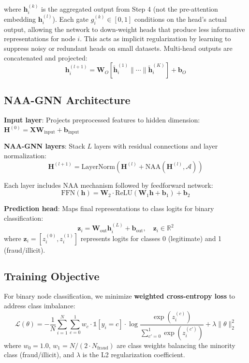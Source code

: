 where $\mathbf{h}_i^{(k)}$ is the aggregated output from Step 4 (not the pre-attention embedding $\mathbf{h}_i^{(l)}$). Each gate $g_i^{(k)} \in [0,1]$ conditions on the head's actual output, allowing the network to down-weight heads that produce less informative representations for node $i$. This acts as implicit regularization by learning to suppress noisy or redundant heads on small datasets. Multi-head outputs are concatenated and projected:
\begin{equation}
\mathbf{h}_i^{(l+1)} = \mathbf{W}_O \left[ \tilde{\mathbf{h}}_i^{(1)} \| \cdots \| \tilde{\mathbf{h}}_i^{(K)} \right] + \mathbf{b}_O
\end{equation}

\subsection{NAA-GNN Architecture}

\textbf{Input layer}: Projects preprocessed features to hidden dimension: $\mathbf{H}^{(0)} = \mathbf{X} \mathbf{W}_{\text{input}} + \mathbf{b}_{\text{input}}$

\textbf{NAA-GNN layers}: Stack $L$ layers with residual connections and layer normalization:
\begin{equation}
\mathbf{H}^{(l+1)} = \text{LayerNorm}\left( \mathbf{H}^{(l)} + \text{NAA}(\mathbf{H}^{(l)}, \mathcal{A}) \right)
\end{equation}

Each layer includes NAA mechanism followed by feedforward network:
\begin{equation}
\text{FFN}(\mathbf{h}) = \mathbf{W}_2 \cdot \text{ReLU}(\mathbf{W}_1 \mathbf{h} + \mathbf{b}_1) + \mathbf{b}_2
\end{equation}

\textbf{Prediction head}: Maps final representations to class logits for binary classification:
\begin{equation}
\mathbf{z}_i = \mathbf{W}_{\text{out}} \mathbf{h}_i^{(L)} + \mathbf{b}_{\text{out}}, \quad \mathbf{z}_i \in \mathbb{R}^{2}
\end{equation}
where $\mathbf{z}_i = [z_i^{(0)}, z_i^{(1)}]$ represents logits for classes 0 (legitimate) and 1 (fraud/illicit).

\subsection{Training Objective}

For binary node classification, we minimize \textbf{weighted cross-entropy loss} to address class imbalance:
\begin{equation}
\mathcal{L}(\theta) = -\frac{1}{N} \sum_{i=1}^{N} \sum_{c=0}^{1} w_c \cdot \mathbb{1}[y_i = c] \cdot \log \frac{\exp(z_i^{(c)})}{\sum_{c'=0}^{1} \exp(z_i^{(c')})} + \lambda \|\theta\|_2^2
\end{equation}
where $w_0 = 1.0$, $w_1 = N/(2 \cdot N_{\text{fraud}})$ are class weights balancing the minority class (fraud/illicit), and $\lambda$ is the L2 regularization coefficient.

